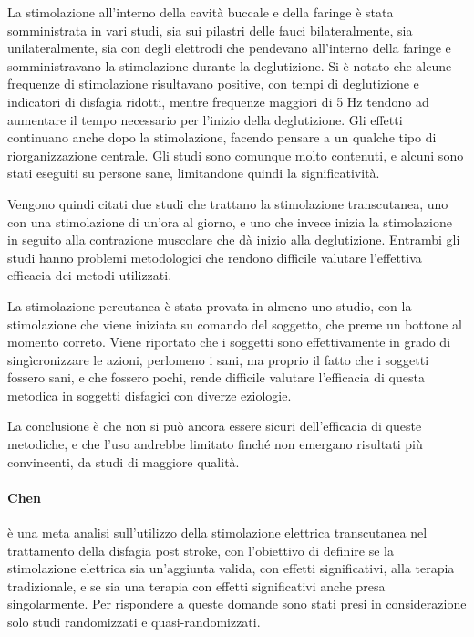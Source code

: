 La stimolazione all'interno della cavità buccale e della faringe è stata 
somministrata in vari studi, sia sui pilastri delle fauci bilateralmente, sia 
unilateralmente, sia con degli elettrodi che pendevano all'interno della 
faringe e somministravano la stimolazione durante la deglutizione.
Si è notato che alcune frequenze di stimolazione risultavano positive, con 
tempi di deglutizione e indicatori di disfagia ridotti, mentre frequenze 
maggiori di 5 Hz tendono ad aumentare il tempo necessario per l'inizio della 
deglutizione.
Gli effetti continuano anche dopo la stimolazione, facendo pensare a un qualche 
tipo di riorganizzazione centrale.
Gli studi sono comunque molto contenuti, e alcuni sono stati eseguiti su 
persone sane, limitandone quindi la significatività.

Vengono quindi citati due studi che trattano la stimolazione transcutanea, uno 
con una stimolazione di un'ora al giorno, e uno che invece inizia la 
stimolazione in seguito alla contrazione muscolare che dà inizio alla 
deglutizione.
Entrambi gli studi hanno problemi metodologici che rendono difficile valutare 
l'effettiva efficacia dei metodi utilizzati.

La stimolazione percutanea è stata provata in almeno uno studio, con la 
stimolazione che viene iniziata su comando del soggetto, che preme un bottone 
al momento correto.
Viene riportato che i soggetti sono effettivamente in grado di singìcronizzare 
le azioni, perlomeno i sani, ma proprio il fatto che i soggetti fossero sani, e 
che fossero pochi, rende difficile valutare l'efficacia di questa metodica in 
soggetti disfagici con diverze eziologie.

La conclusione è che non si può ancora essere sicuri dell'efficacia di queste 
metodiche, e che l'uso andrebbe limitato finché non emergano risultati più 
convincenti, da studi di maggiore qualità.

\paragraph{Chen} \label{par:che} \cite{Chen2015} è una meta analisi 
sull'utilizzo della stimolazione elettrica transcutanea nel trattamento della 
disfagia post stroke, con l'obiettivo di definire se la stimolazione elettrica 
sia un'aggiunta valida, con effetti significativi, alla terapia tradizionale, e 
se sia una terapia con effetti significativi anche presa singolarmente.
Per rispondere a queste domande sono stati presi in considerazione solo studi 
randomizzati e quasi-randomizzati.

